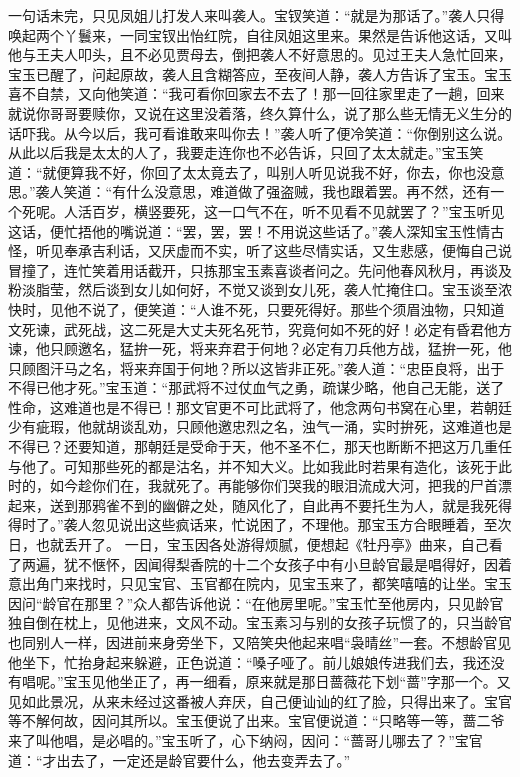 \documentclass[12pt,oneside]{book}
\begin{document}
一句话未完，只见凤姐儿打发人来叫袭人。宝钗笑道：“就是为那话了。”袭人只得唤起两个丫鬟来，一同宝钗出怡红院，自往凤姐这里来。果然是告诉他这话，又叫他与王夫人叩头，且不必见贾母去，倒把袭人不好意思的。见过王夫人急忙回来，宝玉已醒了，问起原故，袭人且含糊答应，至夜间人静，袭人方告诉了宝玉。宝玉喜不自禁，又向他笑道：“我可看你回家去不去了！那一回往家里走了一趟，回来就说你哥哥要赎你，又说在这里没着落，终久算什么，说了那么些无情无义生分的话吓我。从今以后，我可看谁敢来叫你去！”袭人听了便冷笑道：“你倒别这么说。从此以后我是太太的人了，我要走连你也不必告诉，只回了太太就走。”宝玉笑道：“就便算我不好，你回了太太竟去了，叫别人听见说我不好，你去，你也没意思。”袭人笑道：“有什么没意思，难道做了强盗贼，我也跟着罢。再不然，还有一个死呢。人活百岁，横竖要死，这一口气不在，听不见看不见就罢了？”宝玉听见这话，便忙捂他的嘴说道：“罢，罢，罢！不用说这些话了。”袭人深知宝玉性情古怪，听见奉承吉利话，又厌虚而不实，听了这些尽情实话，又生悲感，便悔自己说冒撞了，连忙笑着用话截开，只拣那宝玉素喜谈者问之。先问他春风秋月，再谈及粉淡脂莹，然后谈到女儿如何好，不觉又谈到女儿死，袭人忙掩住口。宝玉谈至浓快时，见他不说了，便笑道：“人谁不死，只要死得好。那些个须眉浊物，只知道文死谏，武死战，这二死是大丈夫死名死节，究竟何如不死的好！必定有昏君他方谏，他只顾邀名，猛拚一死，将来弃君于何地？必定有刀兵他方战，猛拚一死，他只顾图汗马之名，将来弃国于何地？所以这皆非正死。”袭人道：“忠臣良将，出于不得已他才死。”宝玉道：“那武将不过仗血气之勇，疏谋少略，他自己无能，送了性命，这难道也是不得已！那文官更不可比武将了，他念两句书窝在心里，若朝廷少有疵瑕，他就胡谈乱劝，只顾他邀忠烈之名，浊气一涌，实时拚死，这难道也是不得已？还要知道，那朝廷是受命于天，他不圣不仁，那天也断断不把这万几重任与他了。可知那些死的都是沽名，并不知大义。比如我此时若果有造化，该死于此时的，如今趁你们在，我就死了。再能够你们哭我的眼泪流成大河，把我的尸首漂起来，送到那鸦雀不到的幽僻之处，随风化了，自此再不要托生为人，就是我死得得时了。”袭人忽见说出这些疯话来，忙说困了，不理他。那宝玉方合眼睡着，至次日，也就丢开了。
一日，宝玉因各处游得烦腻，便想起《牡丹亭》曲来，自己看了两遍，犹不惬怀，因闻得梨香院的十二个女孩子中有小旦龄官最是唱得好，因着意出角门来找时，只见宝官、玉官都在院内，见宝玉来了，都笑嘻嘻的让坐。宝玉因问“龄官在那里？”众人都告诉他说：“在他房里呢。”宝玉忙至他房内，只见龄官独自倒在枕上，见他进来，文风不动。宝玉素习与别的女孩子玩惯了的，只当龄官也同别人一样，因进前来身旁坐下，又陪笑央他起来唱“袅晴丝”一套。不想龄官见他坐下，忙抬身起来躲避，正色说道：“嗓子哑了。前儿娘娘传进我们去，我还没有唱呢。”宝玉见他坐正了，再一细看，原来就是那日蔷薇花下划“蔷”字那一个。又见如此景况，从来未经过这番被人弃厌，自己便讪讪的红了脸，只得出来了。宝官等不解何故，因问其所以。宝玉便说了出来。宝官便说道：“只略等一等，蔷二爷来了叫他唱，是必唱的。”宝玉听了，心下纳闷，因问：“蔷哥儿哪去了？”宝官道：“才出去了，一定还是龄官要什么，他去变弄去了。”
\end{document}
